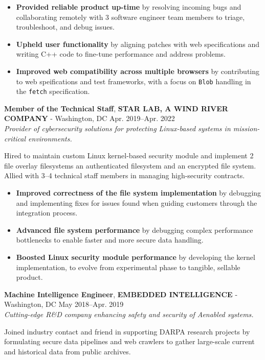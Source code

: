 \documentclass[a4paper,skipsamekey,11pt,english]{curve}
\newcommand{\makeWorkHistoryTitle}[5]{
  \begin{tcolorbox}[colback=base1!10,colframe=base1!10,frame hidden]
    {\color{blue}\textbf{#1}}, \textbf{#2} - #3 \hfill #4\\
    {\small\textit{#5}}
  \end{tcolorbox}
}
\begin{document}
  \begin{itemize}
    \item \textbf{Provided reliable product up-time} by resolving incoming bugs
    and collaborating remotely with 3 software engineer team members to triage,
    troubleshoot, and debug issues.
    \item \textbf{Upheld user functionality} by aligning patches with web
    specifications and writing C++ code to fine-tune performance and address
    problems.
    \item \textbf{Improved web compatibility across multiple browsers} by
    contributing to web speifications and test frameworks, with a focus on
    \texttt{Blob} handling in the \texttt{fetch} specification.
  \end{itemize}

  \makeWorkHistoryTitle
    {Member of the Technical Staff}
    {STAR LAB, A WIND RIVER COMPANY}
    {Washington, DC}
    {Apr. 2019–Apr. 2022}
    {
      Provider of cybersecurity solutions for protecting Linux-based systems
      in mission-critical environments.
    }
  Hired to maintain custom Linux kernel-based security module and
  implement 2 file overlay filesystems an authenticated filesystem and an
  encrypted file system. Allied with 3–4 technical staff members in managing
  high-security contracts.

  \begin{itemize}
    \item \textbf{Improved correctness of the file system implementation}
    by debugging and implementing fixes for issues found when guiding
    customers through the integration process.
    \item \textbf{Advanced file system performance} by debugging complex
    performance bottlenecks to enable faster and more secure data handling.
    \item \textbf{Boosted Linux security module performance} by developing
    the kernel implementation, to evolve from experimental phase to tangible,
    sellable product.
  \end{itemize}

  \makeWorkHistoryTitle
    {Machine Intelligence Engineer}
    {EMBEDDED INTELLIGENCE}
    {Washington, DC}
    {May 2018–Apr. 2019}
    {
      Cutting-edge R\&D company enhancing safety and security of
      A\-enabled systems.
    }
  Joined industry contact and friend in supporting DARPA research
  projects by formulating secure data pipelines and web crawlers to gather
  large-scale current and historical data from public archives.
\end{document}
